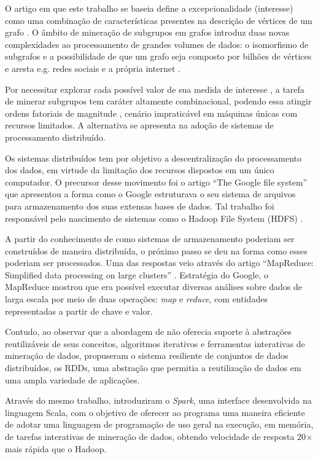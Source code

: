 O artigo em que este trabalho se baseia define a excepcionalidade (interesse) como uma combinação de características presentes na descrição de vértices de um grafo \cite{bendimerad2016unsupervised}. O âmbito de mineração de subgrupos em grafos introduz duas novas complexidades ao processamento de grandes volumes de dados: o isomorfismo de subgrafos e a possibilidade de que um grafo seja composto por bilhões de vértices e aresta e.g. redes sociais e a própria internet \cite{malewicz2010pregel}. 


Por necessitar explorar cada possível valor de sua medida de interesse \cite{novak2009supervised}, a tarefa de minerar subgrupos tem caráter altamente combinacional, podendo essa atingir ordens fatoriais de magnitude \cite{han2007frequent, jiang2013survey}, cenário impraticável em máquinas únicas com recursos limitados. A alternativa se apresenta na adoção de sistemas de processamento distribuído.

Os sistemas distribuídos tem por objetivo a descentralização do processamento dos dados, em virtude da limitação dos recursos dispostos em um único computador. O precursor desse movimento foi o artigo ``The Google file system'' \cite{ghemawat2003google} que apresentou a forma como o Google estruturava o seu sistema de arquivos para armazenamento dos suas extensas bases de dados. Tal trabalho foi responsável pelo nascimento de sistemas como o Hadoop File System (HDFS) \cite{shvachko2010hadoop}. 

A partir do conhecimento de como sistemas de armazenamento poderiam ser construídos de maneira distribuída, o próximo passo se deu na forma como esses poderiam ser processados. Uma das respostas veio através do artigo ``MapReduce: Simplified data processing on large clusters'' \cite{dean2008mapreduce}. Estratégia do Google, o MapReduce mostrou que era possível executar diversas análises sobre dados de larga escala por meio de duas operações: \textit{map} e \textit{reduce}, com entidades representadas a partir de chave e valor.

Contudo, ao observar que a abordagem de  não oferecia suporte à abstrações reutilizáveis de seus conceitos, algoritmos iterativos e ferramentas interativas de mineração de dados,  propuseram o sistema resiliente de conjuntos de dados distribuídos, os RDDs, uma abstração que permitia a reutilização de dados em uma ampla variedade de aplicações.

Através do mesmo trabalho,  introduziram o \textit{Spark}, uma interface desenvolvida na linguagem Scala, com o objetivo de oferecer ao programa uma maneira eficiente de adotar uma linguagem de programação de uso geral na execução, em memória, de tarefas interativas de mineração de dados, obtendo velocidade de resposta 20$\times$ mais rápida que o Hadoop. 




